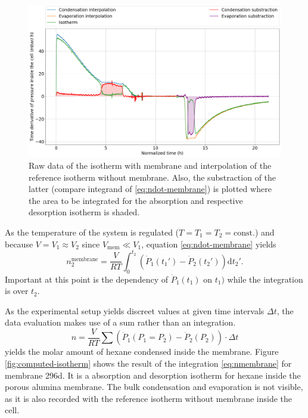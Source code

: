 \documentclass[../thesis.tex]{subfiles}
\begin{document}
        \begin{figure}[ht]
            \centering
            \includegraphics[width=\textwidth]{images/isotherm_comparison_report.png}
            \caption{Raw data of the isotherm with membrane and interpolation of the reference isotherm without membrane. Also, the substraction of the latter (compare integrand of \cref{eq:ndot-membrane}) is plotted where the area to be integrated for the absorption and respective desorption isotherm is shaded. }
            \label{fig:iso-computation}
        \end{figure}

        As the temperature of the system is regulated ($T = T_1 = T_2 = \mathrm{const.}$) and because $V = V_1 \approx V_2$ since $V_\mathrm{mem} \ll V_1$, equation \cref{eq:ndot-membrane} yields
        \begin{equation}
            n_2^\mathrm{membrane} = \frac{V}{RT}\int_0^{t_2}\left(\dot{P}_1(t_1') - \dot{P}_2(t_2')\right) \mathrm{d}t_2'.
            \label{eq:nmembrane}
        \end{equation}
        Important at this point is the dependency of $\dot{P}_1(t_1)$ on $t_1)$ while the integration is over $t_2$.

        As the experimental setup yields discreet values at given time intervals $\Delta t$, the data evaluation makes use of a sum rather than an integration.
        \begin{equation}
            n = \frac{V}{RT} \sum \left( \dot{P}_1 ( P_1 = P_2) - \dot{P}_2(P_2) \right) \cdot \Delta t
            \label{eq:nmembrane}
        \end{equation}
        yields the molar amount of hexane condensed inside the membrane. Figure \cref{fig:computed-isotherm} shows the result of the integration \cref{eq:nmembrane} for membrane 296d. It is a absorption and desorption isotherm for hexane inside the porous alumina membrane. The bulk condensation and evaporation is not visible, as it is also recorded with the reference isotherm without membrane inside the cell.
        \medskip
\end{document}
